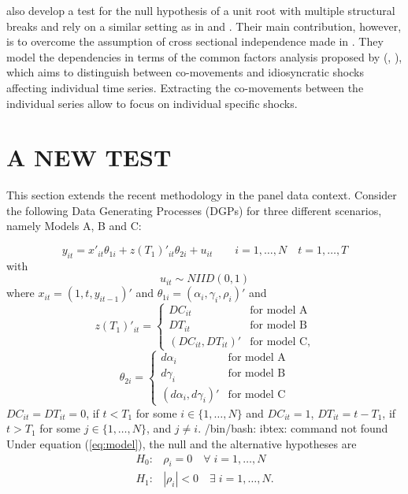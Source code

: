 \documentclass[a4paper,fleqn]{article} %
\begin{document}
\citet{BaiCarrion:2004} also develop a test for the null hypothesis of a unit root with multiple structural breaks and rely on a similar setting as in \citet{Carrion:2002} and \citet{Carrion:2005}. Their main contribution, however, is to overcome the assumption of cross sectional independence made in \citet{Carrion:2005}. They model the dependencies in terms of the common factors analysis proposed by \citeauthor{Bai:2002} (\citeyear{Bai:2002}, \citeyear{Bai:2004}), which aims to distinguish between co-movements and idiosyncratic shocks affecting individual time series. Extracting the co-movements between the individual series allow to focus on individual specific shocks.

\section{A NEW TEST}
This section extends the recent \citet{KimPerron:2009} methodology in the panel data context. Consider the following Data Generating Processes (DGPs) for three different scenarios, namely Models A, B and C:

\begin{equation}
	y_{it}=x'_{it} \theta_{1i} + z(T_1)'_{it} \theta_{2i} + u_{it} \qquad i=1,\dots,N \quad t=1,\dots,T \label{eq:model}
\end{equation}
with
\[
u_{it} \sim NIID(0,1)
\]
where $x_{it}=(1,t,y_{it-1})'$ and $\theta_{1i}=(\alpha_i,\gamma_i, \rho_i)'$ and
\begin{displaymath}
z(T_{1})'_{it} = \left\{ \begin{array}{cc}
DC_{it}  &\textrm{for model A}\\
DT_{it}  &\textrm{for model B}\\
(DC_{it}, DT_{it})' & \textrm{for model C},
\end{array}  \right.
\end{displaymath}
\begin{displaymath}
\theta_{2i} = \left\{ \begin{array}{cc}
d\alpha_i  &\textrm{for model A}\\
d\gamma_i  &\textrm{for model B}\\
(d\alpha_{i}, d\gamma_{i})' & \textrm{for model C}
\end{array}  \right.
\end{displaymath}
$DC_{it}=DT_{it}=0$, if $t<T_1$ for some $i \in \{1, \ldots, N\}$ and $DC_{it}=1$, $DT_{it}=t-T_1$, if $t>T_1$ for some $j \in \{1, \ldots, N\}$, and $j \neq i$.
/bin/bash: ibtex: command not found
Under equation (\ref{eq:model}), the null and the alternative hypotheses are
\begin{align*}
H_0: {} & \rho_i = 0  \quad \forall \; i=1, \ldots, N \\
H_1: {} & |\rho_i| < 0 \quad \exists \; i=1, \ldots, N.
\end{align*}
\end{document}
